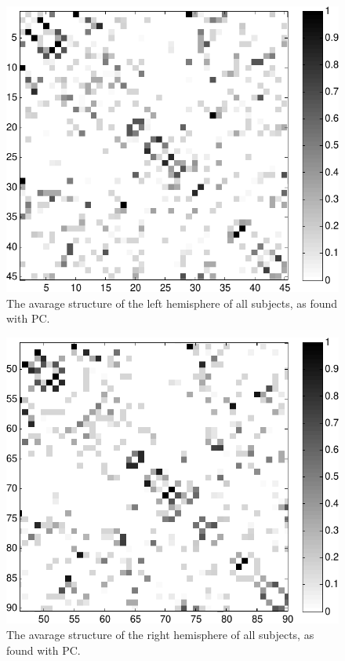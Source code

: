 \documentclass[a4paper, 10pt, english, onecolumn]{article}
\begin{document}
\begin{figure}[h!]
  \centering
  \includegraphics{images/struct_hemisphere_1_45}
  \caption{The avarage structure of the left hemisphere of all subjects, as found with PC.}
  \label{fig:struct_left}
\end{figure}
\begin{figure}[h!]
  \centering
  \includegraphics{images/struct_hemisphere_46_90}
  \caption{The avarage structure of the right hemisphere of all subjects, as found with PC.}
  \label{fig:struct_right}
\end{figure}
\end{document}
